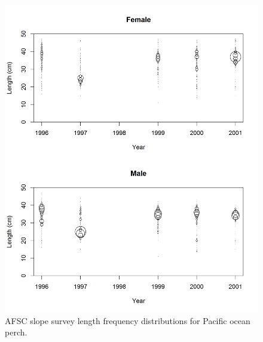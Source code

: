 \documentclass[12pt,]{article}
\begin{document}
\begin{figure}
\centering
\includegraphics{Figures/AFSCslope_Lengths.png}
\caption{AFSC slope survey length frequency distributions for Pacific
ocean perch. \label{fig:afsc_Length}}
\end{figure}
\end{document}
